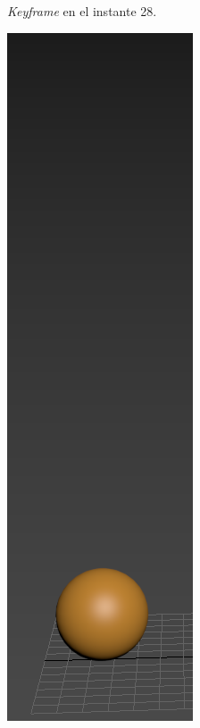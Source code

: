 \documentclass{article}
\begin{document}
\begin{figure}[H]
\begin{subfigure}[H]{0.15\textwidth}
	    \caption{\textit{Keyframe} en el instante 28.}
	\end{subfigure}
    \hfill
	\begin{subfigure}[H]{0.15\textwidth}
	    \centering
	    \includegraphics[width=\textwidth]{imagenes/Ejercicio 2/p1_suelo2.png}

\end{subfigure}
\end{figure}
\end{document}
